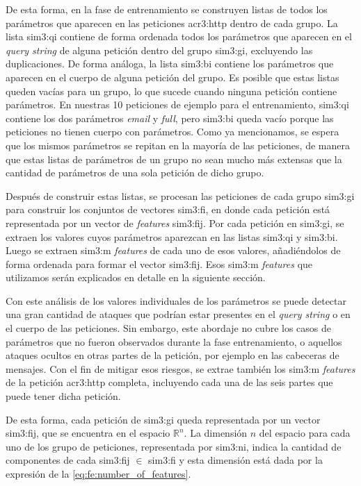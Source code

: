 De esta forma, en la fase de entrenamiento se construyen listas de todos
los parámetros que aparecen en las peticiones \gls{acr3:http} dentro
de cada grupo. La lista \gls{sim3:qi} contiene de forma ordenada todos
los parámetros que aparecen en el \textit{query string} de alguna
petición dentro del grupo \gls{sim3:gi}, excluyendo las duplicaciones.
De forma análoga, la lista \gls{sim3:bi} contiene los parámetros que
aparecen en el cuerpo de alguna petición del grupo.
Es posible que estas listas queden vacías para un grupo, lo que sucede
cuando ninguna petición contiene parámetros. En nuestras 10 peticiones
de ejemplo para el entrenamiento, \gls{sim3:qi} contiene los dos parámetros
\textit{email} y \textit{full}, pero \gls{sim3:bi} queda vacío porque las
peticiones no tienen cuerpo con parámetros.
Como ya mencionamos, se espera que los mismos parámetros se repitan en la
mayoría de las peticiones, de manera que estas listas de parámetros de un
grupo no sean mucho más extensas que la cantidad de parámetros de una sola
petición de dicho grupo.

Después de construir estas listas, se procesan las peticiones de cada
grupo \gls{sim3:gi} para construir los conjuntos de vectores \gls{sim3:fi},
en donde cada petición está representada por un vector de \textit{features}
\gls{sim3:fij}.
Por cada petición en \gls{sim3:gi}, se extraen los valores cuyos parámetros
aparezcan en las listas \gls{sim3:qi} y \gls{sim3:bi}. Luego se extraen
\gls{sim3:m} \textit{features} de cada uno de esos valores, añadiéndolos
de forma ordenada para formar el vector \gls{sim3:fij}. Esos \gls{sim3:m}
\textit{features} que utilizamos serán explicados en detalle en la
siguiente sección.

Con este análisis de los valores individuales de los parámetros se puede
detectar una gran cantidad de ataques que podrían estar presentes en el
\textit{query string} o en el cuerpo de las peticiones. Sin embargo, este
abordaje no cubre los casos de parámetros que no fueron observados durante
la fase entrenamiento, o aquellos ataques ocultos en otras partes de la
petición, por ejemplo en las cabeceras de mensajes.
Con el fin de mitigar esos riesgos, se extrae también los \gls{sim3:m}
\textit{features} de la petición \gls{acr3:http} completa, incluyendo
cada una de las seis partes que puede tener dicha petición.

De esta forma, cada petición de \gls{sim3:gi} queda representada por un
vector \gls{sim3:fij}, que se encuentra en el espacio $\mathbb{R}^{n}$.
La dimensión $n$ del espacio para cada uno de los grupo de peticiones,
representada por \gls{sim3:ni}, indica la cantidad de componentes de cada
\gls{sim3:fij} $\in$ \gls{sim3:fi} y esta dimensión está dada por la
expresión de la
\autoref{eq:fe:number_of_features}.

